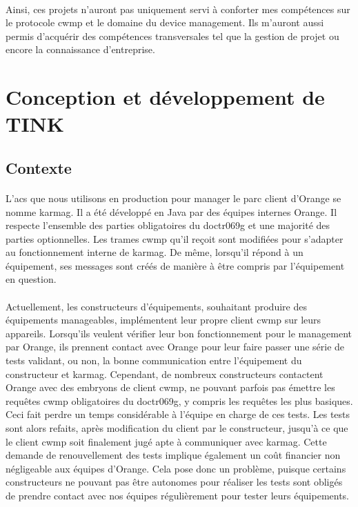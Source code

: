 \documentclass[12pt,a4paper]{report}
\begin{document}
\paragraph*{}Ainsi, ces projets n'auront pas uniquement servi à conforter mes compétences sur le protocole \gls{cwmp} et le domaine du device management. Ils m'auront aussi permis d'acquérir des compétences transversales tel que la gestion de projet ou encore la connaissance d'entreprise.\\


\newpage
\section{Conception et développement de TINK}
\subsection{Contexte}
\paragraph*{}L’\gls{acs} que nous utilisons en production pour manager le parc client d'Orange se nomme \gls{karmag}. Il a été développé en Java par des équipes internes Orange. Il respecte l’ensemble des parties obligatoires du \gls{doctr069g} et une majorité des parties optionnelles. Les trames \gls{cwmp} qu’il reçoit sont modifiées pour s’adapter au fonctionnement interne de \gls{karmag}. De même, lorsqu’il répond à un équipement, ses messages sont créés de manière à être compris par l’équipement en question. 
\paragraph*{}Actuellement, les constructeurs d’équipements, souhaitant produire des
équipements manageables, implémentent leur propre client \gls{cwmp} sur leurs appareils. Lorsqu’ils veulent vérifier leur bon fonctionnement pour le management par Orange, ils prennent contact avec Orange pour leur faire passer une série de tests validant, ou non, la bonne communication entre l’équipement du constructeur et \gls{karmag}. Cependant, de nombreux constructeurs contactent Orange avec des embryons de client \gls{cwmp}, ne pouvant parfois pas émettre les requêtes \gls{cwmp} obligatoires du \gls{doctr069g}, y compris les requêtes les plus basiques. Ceci fait perdre un temps considérable à l’équipe en charge de ces tests. Les tests sont alors refaits, après modification du client par le constructeur, jusqu’à ce que le client \gls{cwmp} soit finalement jugé apte à communiquer avec \gls{karmag}. Cette demande de renouvellement des tests implique également un coût financier non négligeable aux équipes d’Orange. Cela pose donc un problème, puisque certains constructeurs ne pouvant pas être autonomes pour réaliser les tests sont obligés de prendre contact avec nos équipes régulièrement pour tester leurs équipements.\\
\end{document}

